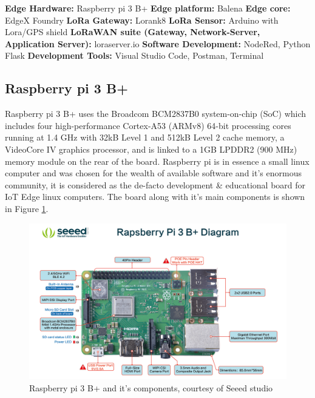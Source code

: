\bigskip
\noindent
\textbf{Edge Hardware:} Raspberry pi 3 B+
\newline
\textbf{Edge platform:} Balena
\newline
\textbf{Edge core:} EdgeX Foundry
\newline
\textbf{LoRa Gateway:} Lorank8
\newline
\textbf{LoRa Sensor:} Arduino with Lora/GPS shield
\newline
\textbf{LoRaWAN suite (Gateway, Network-Server, Application Server):} loraserver.io
\newline
\textbf{Software Development:} NodeRed, Python Flask
\newline
\textbf{Development Tools:} Visual Studio Code, Postman, Terminal

\subsection{Raspberry pi 3 B+}

Raspberry pi 3 B+ \cite{rpi3} uses the Broadcom BCM2837B0 system-on-chip (SoC) which includes four high-performance Cortex-A53 (ARMv8) 64-bit processing cores running at 1.4 GHz with 32kB Level 1 and 512kB Level 2 cache memory, a VideoCore IV graphics processor, and is linked to a 1GB LPDDR2 (900 MHz) memory module on the rear of the board. Raspberry pi is in essence a small linux computer and was chosen for the wealth of available software and it’s enormous community, it is considered as the de-facto development \& educational board for IoT Edge linux computers. The board along with it's main components is shown in Figure \ref{fig:Raspberrypi3}.

\begin{figure}[h]
    \centering
    \includegraphics[width=1\textwidth]{images/raspberrypi3.jpg}
    \caption{Raspberry pi 3 B+ and it's components, courtesy of Seeed studio \cite{rpiseeed}}
    \label{fig:Raspberrypi3}
\end{figure}

